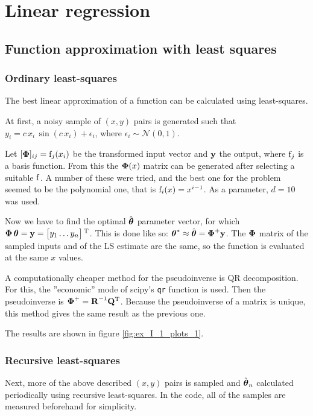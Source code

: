\section{Linear regression}

\subsection{Function approximation with least squares}


\subsubsection*{Ordinary least-squares}

The best linear approximation of a function can be calculated using least-squares.

At first, a noisy sample of $(x, y)$ pairs is generated such that
$y_i = c\,x_i\,\sin(c\,x_i) + \epsilon_i$, where $\epsilon_i\sim\mathcal{N}(0,1)$.

Let $[\boldsymbol{\mathrm{\Phi}}]_{ij}=\mathrm{f}_j(x_i)$ be the transformed input vector and $\boldsymbol{\mathrm{y}}$ the output,
where $\mathrm{f}_j$ is a basis function.
From this the $\boldsymbol{\mathrm{\Phi}}(x)$ matrix can be generated
after selecting a suitable $\mathrm{f}$. A number of these were tried, and the best one for
the problem seemed to be the polynomial one, that is $\mathrm{f}_{i}(x) = x^{i-1}$.
As a parameter, $d=10$ was used.

Now we have to find the optimal $\hat{\boldsymbol{\mathrm{\theta}}}$ parameter vector,
for which $\boldsymbol{\mathrm{\Phi}}\,\boldsymbol{\mathrm{\theta}}=\boldsymbol{\mathrm{y}}=\begin{bmatrix}y_1\dots y_n\end{bmatrix}\textsuperscript{T}$.
This is done like so: $\boldsymbol{\mathrm{\theta}}^*\approx\hat{\boldsymbol{\mathrm{\theta}}}=\boldsymbol{\mathrm{\Phi}}^+\boldsymbol{\mathrm{y}}$.
The $\boldsymbol{\mathrm{\Phi}}$ matrix of the sampled inputs and of the LS estimate are the same,
so the function is evaluated at the same $x$ values.

A computationally cheaper method for the pseudoinverse is QR decomposition. For this,
the ''economic'' mode of scipy's \verb|qr| function is used.
Then the pseudoinverse is $\boldsymbol{\mathrm{\Phi}}^+=\boldsymbol{\mathrm{R}}^{-1}\boldsymbol{\mathrm{Q}}\textsuperscript{T}$.
Because the pseudoinverse of a matrix is unique,
this method gives the same result as the previous one.

The results are shown in figure \ref{fig:ex_I_1_plots_1}.

\subsubsection*{Recursive least-squares}

Next, more of the above described $(x, y)$ pairs is sampled and $\hat{\boldsymbol{\mathrm{\theta}}}_{n}$ calculated periodically using recursive least-squares. In the code, all of the samples are measured beforehand for simplicity.

